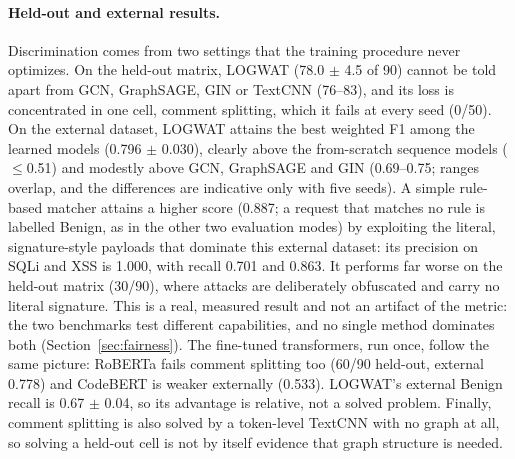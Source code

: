 \paragraph{Held-out and external results.}
Discrimination comes from two settings that the training procedure never optimizes. On the held-out matrix, LOGWAT (78.0 $\pm$ 4.5 of 90) cannot be told apart from GCN, GraphSAGE, GIN or TextCNN (76--83), and its loss is concentrated in one cell, comment splitting, which it fails at every seed (0/50). On the external dataset, LOGWAT attains the best weighted F1 among the learned models (0.796 $\pm$ 0.030), clearly above the from-scratch sequence models ($\leq$0.51) and modestly above GCN, GraphSAGE and GIN (0.69--0.75; ranges overlap, and the differences are indicative only with five seeds). A simple rule-based matcher attains a higher score (0.887; a request that matches no rule is labelled Benign, as in the other two evaluation modes) by exploiting the literal, signature-style payloads that dominate this external dataset: its precision on SQLi and XSS is 1.000, with recall 0.701 and 0.863. It performs far worse on the held-out matrix (30/90), where attacks are deliberately obfuscated and carry no literal signature. This is a real, measured result and not an artifact of the metric: the two benchmarks test different capabilities, and no single method dominates both (Section~\ref{sec:fairness}). The fine-tuned transformers, run once, follow the same picture: RoBERTa fails comment splitting too (60/90 held-out, external 0.778) and CodeBERT is weaker externally (0.533). LOGWAT's external Benign recall is 0.67 $\pm$ 0.04, so its advantage is relative, not a solved problem. Finally, comment splitting is also solved by a token-level TextCNN with no graph at all, so solving a held-out cell is not by itself evidence that graph structure is needed.

